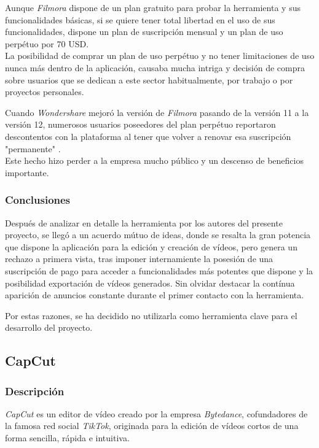 Aunque \textit{Filmora} dispone de un plan gratuito para probar la herramienta 
y sus funcionalidades básicas, si se quiere tener total libertad en el uso de 
sus funcionalidades, dispone un plan de suscripción mensual y un plan de uso perpétuo 
por 70 USD.\\
La posibilidad de comprar un plan de uso perpétuo y no tener limitaciones de uso 
nunca más dentro de la aplicación, causaba mucha intriga y decisión de compra sobre 
usuarios que se dedican a este sector habitualmente, por trabajo o por proyectos personales.

Cuando \textit{Wondershare} mejoró la versión de \textit{Filmora} pasando de la versión 
11 a la versión 12, numerosos usuarios poseedores del plan perpétuo reportaron 
descontentos con la plataforma al tener que volver a renovar esa suscripción "permanente" \cite{filmora-caracteristicas}.\\
Este hecho hizo perder a la empresa mucho público y un descenso de beneficios importante.

\subsubsection{Conclusiones}
Después de analizar en detalle la herramienta por los autores del presente proyecto, 
se llegó a un acuerdo mútuo de ideas, donde se resalta la gran potencia que dispone 
la aplicación para la edición y creación de vídeos, pero genera un rechazo a primera vista, 
tras imponer internamiente la posesión de una suscripción de pago para acceder a funcionalidades 
más potentes que dispone y la posibilidad exportación de vídeos generados. 
Sin olvidar destacar la contínua aparición de anuncios
constante durante el primer contacto con la herramienta.

Por estas razones, se ha decidido no utilizarla como herramienta clave para 
el desarrollo del proyecto.

\subsection{CapCut}
\subsubsection{Descripción}
\textit{CapCut} es un editor de vídeo creado por la empresa \textit{Bytedance}, cofundadores de 
la famosa red social \textit{TikTok}, originada para la edición de vídeos cortos de una forma 
sencilla, rápida e intuitiva.

